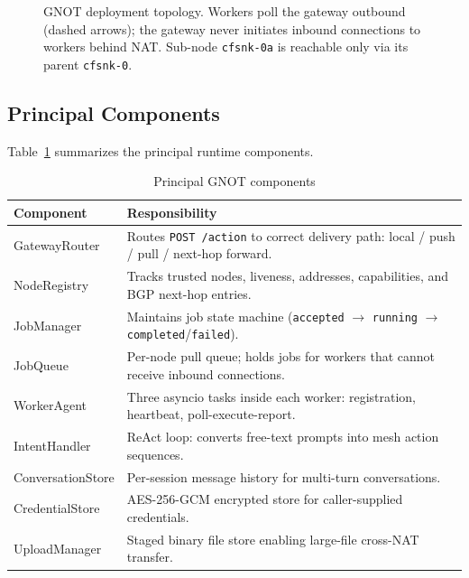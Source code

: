 \documentclass[10pt,twocolumn]{article}
\begin{document}
\begin{figure}[tp]
{
}%
\caption{GNOT deployment topology. Workers poll the gateway outbound
(dashed arrows); the gateway never initiates inbound connections to
workers behind NAT\@. Sub-node \texttt{cfsnk-0a} is reachable only
via its parent \texttt{cfsnk-0}.}
\label{fig:topology}
\end{figure}

\subsection{Principal Components}

Table~\ref{tab:components} summarizes the principal runtime components.

\begin{table}[tp]
\centering
\caption{Principal GNOT components}
\label{tab:components}
\small
\begin{tabular}{@{}lp{5.0cm}@{}}
\toprule
\textbf{Component} & \textbf{Responsibility} \\
\midrule
GatewayRouter & Routes \texttt{POST /action} to correct delivery path: local / push / pull / next-hop forward. \\
NodeRegistry & Tracks trusted nodes, liveness, addresses, capabilities, and BGP next-hop entries. \\
JobManager & Maintains job state machine (\texttt{accepted} $\to$ \texttt{running} $\to$ \texttt{completed}/\texttt{failed}). \\
JobQueue & Per-node pull queue; holds jobs for workers that cannot receive inbound connections. \\
WorkerAgent & Three asyncio tasks inside each worker: registration, heartbeat, poll-execute-report. \\
IntentHandler & ReAct loop: converts free-text prompts into mesh action sequences. \\
ConversationStore & Per-session message history for multi-turn conversations. \\
CredentialStore & AES-256-GCM encrypted store for caller-supplied credentials. \\
UploadManager & Staged binary file store enabling large-file cross-NAT transfer. \\
\bottomrule
\end{tabular}
\end{table}
\end{document}
